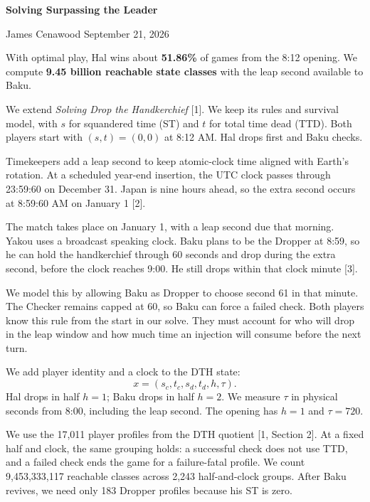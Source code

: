 \documentclass[10pt]{article}
\newcommand{\head}[1]{\par\vspace{5pt}{\fontsize{11}{12}\selectfont\bfseries #1}\par\vspace{2pt}}
\begin{document}
{\LARGE\bfseries Solving Surpassing the Leader}\par
James Cenawood \hfill September 21, 2026
\vspace{4pt}

With optimal play, Hal wins about \textbf{51.86\%} of games from the 8:12 opening.
We compute \textbf{9.45 billion reachable state classes} with the leap second available to Baku.

\begin{minipage}[t]{0.55\textwidth}
\vspace{0pt}
\head{1. From DTH to STL}
We extend \emph{Solving Drop the Handkerchief} [1]. We keep its rules
and survival model, with $s$ for squandered time (ST) and $t$ for
total time dead (TTD). Both players start with $(s,t)=(0,0)$ at
8:12 AM. Hal drops first and Baku checks.

Timekeepers add a leap second to keep atomic-clock time aligned with
Earth's rotation. At a scheduled year-end insertion, the UTC clock
passes through 23:59:60 on December 31. Japan is nine hours ahead,
so the extra second occurs at 8:59:60 AM on January 1 [2].

The match takes place on January 1, with a leap second due that
morning. Yakou uses a broadcast speaking clock. Baku plans to be
the Dropper at 8:59, so he can hold the handkerchief through 60
seconds and drop during the extra second, before the clock reaches
9:00. He still drops within that clock minute [3].

We model this by allowing Baku as Dropper to choose second 61 in
that minute. The Checker remains capped at 60, so Baku can force
a failed check. Both players know this rule from the start in our
solve. They must account for who will drop in the leap window and
how much time an injection will consume before the next turn.

We add player identity and a clock to the DTH state:
\[
x=(s_c,t_c,s_d,t_d,h,\tau).
\]
Hal drops in half $h=1$; Baku drops in half $h=2$.
We measure $\tau$ in physical seconds from 8:00, including the leap
second. The opening has $h=1$ and $\tau=720$.

We use the 17,011 player profiles from the DTH quotient
[1, Section 2]. At a fixed half and clock, the same grouping holds:
a successful check does not use TTD, and a failed check ends the
game for a failure-fatal profile. We count 9,453,333,117 reachable
classes across 2,243 half-and-clock groups. After Baku revives,
we need only 183 Dropper profiles because his ST is zero.


\end{minipage}
\end{document}
